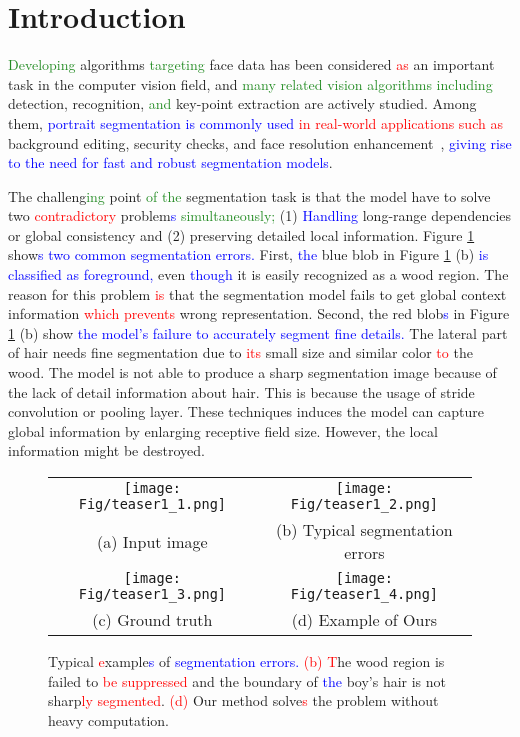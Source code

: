 \documentclass[10pt,twocolumn,letterpaper]{article}
\newcommand\Lars[1]{\textcolor{blue}{#1}}
\newcommand\yj[1]{\textcolor{ForestGreen}{#1}}
\newcommand\hj[1]{\textcolor{Sepia}{#1}}
\newcommand\nj[1]{\textcolor{red}{#1}}
\newcommand\Lars[1]{#1}
\newcommand\yj[1]{#1}
\newcommand\hj[1]{#1}
\newcommand\nj[1]{#1}
\begin{document}
\section{Introduction}
\label{sec:intro}

\yj{Developing} algorithms \yj{targeting} face data has been considered \nj{as} an important task in the computer vision field, and \yj{many related vision algorithms including} detection, recognition, \yj{and} key-point extraction are actively studied.
Among them, \Lars{portrait segmentation is commonly used} \nj{in real\hj{-world} applications such as}
background editing, security checks, and face resolution enhancement~\cite{shen2016automatic, zhang2019portraitnet}, \Lars{giving rise to the need for fast and robust segmentation models}.




The challeng\yj{ing} point \yj{of the} segmentation task is that the model have to solve two \nj{contradictory}
problem\Lars{s} \yj{simultaneously; }(1) \Lars{Handling} long-range dependencies or global consistency and (2) preserving detailed local information.
Figure \ref{fig:teaser1} show\Lars{s two common segmentation errors.} First, \Lars{the} blue blob in Figure \ref{fig:teaser1} (b) \Lars{is classified as foreground, }even \Lars{though} it is easily recognized as a wood region.
The reason for this problem \nj{is} that the segmentation model fails to get global context information \nj{which prevents} wrong representation.
Second, the red blob\Lars{s} in Figure \ref{fig:teaser1} (b) show \Lars{the model's failure to accurately segment fine details. }The lateral part of hair needs fine segmentation due to \nj{its} small size and similar color \nj{to} the wood. The model is not able to produce a sharp segmentation image because of the lack of detail information about hair.
\hj{This is because the usage of stride convolution or pooling layer. These techniques induces the model can capture global information by enlarging receptive field size. However, the local information might be destroyed.}


\begin{figure}[t]
\begin{center}
\begin{tabular}{c c}
    \texttt{[image: Fig/teaser1\_1.png]} & \texttt{[image: Fig/teaser1\_2.png]} \\ 
    (a) Input image & (b) Typical segmentation errors\\ \texttt{[image: Fig/teaser1\_3.png]} & \texttt{[image: Fig/teaser1\_4.png]} \\ 
    (c) Ground truth & (d) Example of Ours \\
        \end{tabular}\end{center}
   \caption{Typical \nj{e}xample\Lars{s} of \Lars{segmentation errors. }\nj{(b) T}he wood region is failed to \nj{be suppressed} and the boundary of \Lars{the} boy's hair is not sharp\nj{ly segmented}. \nj{(d)} Our method solve\nj{s} the problem without heavy computation.}
\label{fig:teaser1}
\end{figure}
\end{document}

